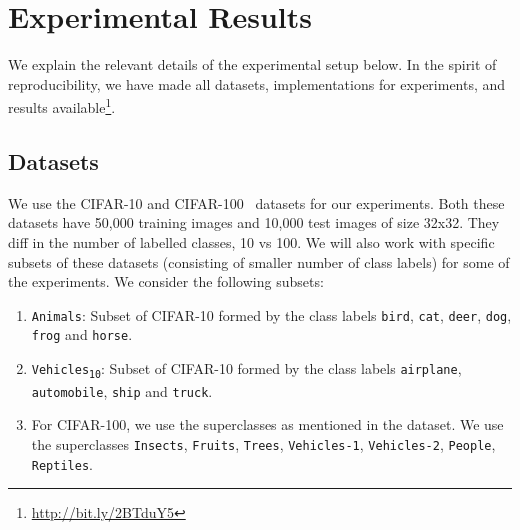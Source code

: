 \documentclass[../main]{subfiles}
\begin{document}
\section{Experimental Results}
    \label{sec:expts}
    We explain the relevant details of the experimental setup below.
    In the spirit of reproducibility, we have made all datasets, implementations for experiments, and results available\footnote{\url{http://bit.ly/2BTduY5}}.
    
    
    \subsection{Datasets}
        \label{sec:datasets}
        We use the CIFAR-10 and CIFAR-100~\cite{krizhevsky2009learning} datasets for our experiments.
        Both these datasets have 50,000 training images and 10,000 test images of size 32x32.
        They diff in the number of labelled classes, 10 vs 100.
        We will also work with specific subsets of these datasets (consisting of smaller number of class labels) for some of the experiments.
        We consider the following subsets:
        \begin{enumerate}
            \item   \texttt{Animals}: Subset of CIFAR-10 formed by the class labels \texttt{bird}, \texttt{cat}, \texttt{deer}, \texttt{dog}, \texttt{frog} and \texttt{horse}.
            \item   \texttt{Vehicles\textsubscript{10}}: Subset of CIFAR-10 formed by the class labels \texttt{airplane}, \texttt{automobile}, \texttt{ship} and \texttt{truck}.
            \item   For CIFAR-100, we use the superclasses as mentioned in the dataset.
            We use the superclasses \texttt{Insects}, \texttt{Fruits}, \texttt{Trees}, \texttt{Vehicles-1}, \texttt{Vehicles-2}, \texttt{People}, \texttt{Reptiles}.
        \end{enumerate}
\end{document}
